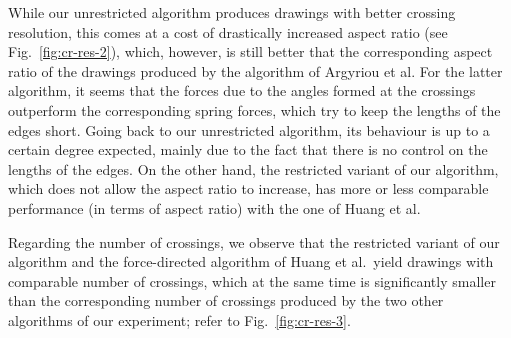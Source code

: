 \documentclass[runningheads]{llncs}
\begin{document}
While our unrestricted algorithm produces drawings with better crossing resolution, this comes at a cost of drastically increased aspect ratio (see Fig.~\ref{fig:cr-res-2}), which, however, is still better that the corresponding aspect ratio of the drawings produced by the algorithm of Argyriou et al. For the latter algorithm, it seems that the forces due to the angles formed at the crossings outperform the corresponding spring forces, which try to keep the lengths of the edges short. Going back to our unrestricted algorithm, its behaviour is up to a certain degree expected, mainly due to the fact that there is no control on the lengths of the edges.
On the other hand, the restricted variant of our algorithm, which does not allow the aspect ratio to increase, has more or less comparable performance (in terms of aspect ratio) with the one of Huang et al.

Regarding the number of crossings, we observe that the restricted variant of our algorithm and the force-directed algorithm of Huang et al.\ yield drawings with comparable number of crossings, which at the same time is significantly smaller than the corresponding number of crossings produced by the two other algorithms of our experiment; refer to Fig.~\ref{fig:cr-res-3}. 
\end{document}
